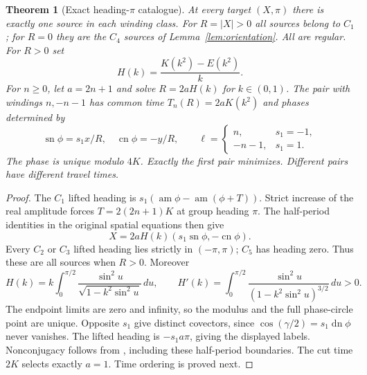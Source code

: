 \documentclass[11pt,a4paper]{article}
\newtheorem{theorem}{Theorem}[section]
\theoremstyle{remark}\newtheorem{remark}[theorem]{Remark}
\newcommand{\sn}{\operatorname{sn}}
\newcommand{\cn}{\operatorname{cn}}
\newcommand{\dn}{\operatorname{dn}}
\begin{document}
\begin{theorem}[Exact heading-$\pi$ catalogue]\label{thm:pi}
At every target $(X,\pi)$ there is exactly one source in each winding
class. For $R=|X|>0$ all sources belong to $C_1$; for $R=0$ they are
the $C_4$ sources of Lemma~\ref{lem:orientation}. All are regular.
For $R>0$ set
\[
 H(k)=\frac{K(k^2)-E(k^2)}k.
\]
For $n\ge0$, let $a=2n+1$ and solve $R=2aH(k)$ for $k\in(0,1)$.
The pair with windings $n,-n-1$ has common time
$T_n(R)=2aK(k^2)$ and phases determined by
\[
 \sn\phi=s_1x/R,\quad \cn\phi=-y/R,\qquad
 \ell=\begin{cases}n,&s_1=-1,\\-n-1,&s_1=1.\end{cases}
\]
The phase is unique modulo $4K$. Exactly the first pair minimizes.
Different pairs have different travel times.
\end{theorem}
\begin{proof}
The $C_1$ lifted heading is
$s_1(\operatorname{am}\phi-\operatorname{am}(\phi+T))$.
Strict increase of the real amplitude forces
$T=2(2n+1)K$ at group heading $\pi$. The half-period identities in
the original spatial equations then give
\[
 X=2aH(k)(s_1\sn\phi,-\cn\phi).
\]
Every $C_2$ or $C_3$ lifted heading lies strictly in $(-\pi,\pi)$;
$C_5$ has heading zero. Thus these are all sources when $R>0$.
Moreover
\[
 H(k)=k\int_0^{\pi/2}\frac{\sin^2u}{\sqrt{1-k^2\sin^2u}}\,du,
 \qquad
 H'(k)=\int_0^{\pi/2}
       \frac{\sin^2u}{(1-k^2\sin^2u)^{3/2}}\,du>0.
\]
The endpoint limits are zero and infinity, so the modulus and the full
phase-circle point are unique. Opposite $s_1$ give distinct covectors,
since $\cos(\gamma/2)=s_1\dn\phi$ never vanishes.
The lifted heading is $-s_1a\pi$, giving the displayed labels.
Nonconjugacy follows from \cite[Theorem 2.1]{SC}, including these
half-period boundaries. The cut time $2K$ \cite[(2.1)]{SS} selects
exactly $a=1$. Time ordering is proved next.
\end{proof}
\end{document}
